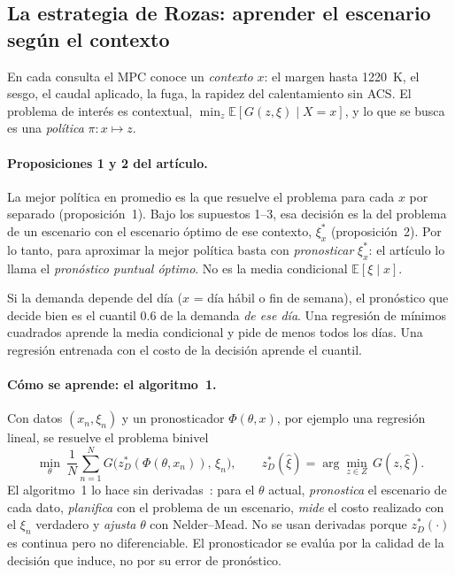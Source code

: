 \subsection{La estrategia de Rozas: aprender el escenario según el contexto}\label{sec:rozas-estrategia}
En cada consulta el MPC conoce un \emph{contexto} $x$: el margen hasta 1220~K, el sesgo, el caudal
aplicado, la fuga, la rapidez del calentamiento sin ACS. El problema de interés es contextual,
$\min_{z}\mathbb E[G(z,\xi)\mid X=x]$, y lo que se busca es una \emph{política} $\pi:x\mapsto z$.

\paragraph{Proposiciones 1 y 2 del artículo.} La mejor política en promedio es la que resuelve
el problema para cada $x$ por separado (proposición~1). Bajo los supuestos 1--3, esa decisión es
la del problema de un escenario con el escenario óptimo de ese contexto, $\xi^*_x$
(proposición~2). Por lo tanto, para aproximar la mejor política basta con \emph{pronosticar}
$\xi^*_x$: el artículo lo llama el \emph{pronóstico puntual óptimo}. No es la media condicional
$\mathbb E[\xi\mid x]$.

\begin{ejemplo}
Si la demanda depende del día ($x$ = día hábil o fin de semana), el pronóstico que decide bien es
el cuantil 0.6 de la demanda \emph{de ese día}. Una regresión de mínimos cuadrados aprende la
media condicional y pide de menos todos los días. Una regresión entrenada con el costo de la
decisión aprende el cuantil.
\end{ejemplo}

\paragraph{Cómo se aprende: el algoritmo~1.} Con datos $(x_n,\xi_n)$ y un pronosticador
$\Phi(\theta,x)$, por ejemplo una regresión lineal, se resuelve el problema binivel
\[
\min_\theta\ \frac1N\sum_{n=1}^N G\big(z^*_D(\Phi(\theta,x_n)),\,\xi_n\big),\qquad
z^*_D(\hat\xi)=\arg\min_{z\in Z}\,G(z,\hat\xi).
\]
El algoritmo~1 lo hace sin derivadas~\cite{diasgarcia2024}: para el $\theta$ actual,
\emph{pronostica} el escenario de cada dato, \emph{planifica} con el problema de un escenario,
\emph{mide} el costo realizado con el $\xi_n$ verdadero y \emph{ajusta} $\theta$ con Nelder--Mead.
No se usan derivadas porque $z^*_D(\cdot)$ es continua pero no diferenciable. El pronosticador se
evalúa por la calidad de la decisión que induce, no por su error de pronóstico.

